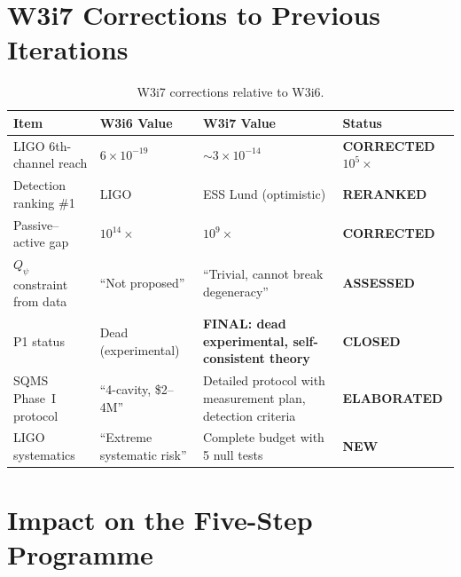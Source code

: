 \documentclass[11pt]{article}
\newcommand{\ee}[1]{\times 10^{#1}}
\newcommand{\Qpsi}{Q_\psi}
\theoremstyle{definition}
\theoremstyle{remark}
\begin{document}
\section{W3i7 Corrections to Previous Iterations}
\label{sec:w3i7_corrections}

\begin{table}[H]
\centering
\caption{W3i7 corrections relative to W3i6.}
\label{tab:w3i7_corrections}
\renewcommand{\arraystretch}{1.25}
\begin{tabular}{@{}p{4cm}p{3cm}p{3cm}l@{}}
\toprule
\textbf{Item} & \textbf{W3i6 Value} & \textbf{W3i7 Value} &
  \textbf{Status} \\
\midrule
LIGO 6th-channel reach & $6\ee{-19}$ & $\sim 3\ee{-14}$ &
  \textcolor{falsified}{\textbf{CORRECTED $10^5\times$}} \\
Detection ranking \#1 & LIGO & ESS Lund (optimistic) &
  \textcolor{conjcolor}{\textbf{RERANKED}} \\
Passive--active gap & $10^{14}\times$ & $10^{9}\times$ &
  \textcolor{conjcolor}{\textbf{CORRECTED}} \\
$\Qpsi$ constraint from data & ``Not proposed'' & ``Trivial, cannot
  break degeneracy'' &
  \textcolor{falsified}{\textbf{ASSESSED}} \\
P1 status & Dead (experimental) & \textbf{FINAL: dead experimental,
  self-consistent theory} &
  \textcolor{falsified}{\textbf{CLOSED}} \\
SQMS Phase~I protocol & ``4-cavity, \$2--4M'' & Detailed protocol
  with measurement plan, detection criteria &
  \textcolor{strongcolor}{\textbf{ELABORATED}} \\
LIGO systematics & ``Extreme systematic risk'' & Complete budget with
  5 null tests &
  \textcolor{strongcolor}{\textbf{NEW}} \\
\bottomrule
\end{tabular}
\end{table}

\section{Impact on the Five-Step Programme}
\label{sec:five_step_update}
\end{document}

